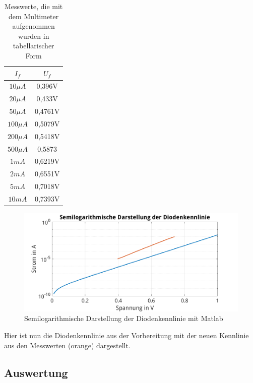 \documentclass{article}
\begin{document}
\begin{table}[h]
  \begin{center}
\begin{tabular}{|c|c|}
  \hline
  $I_{f}$ & $U_{f}$  \\
  \hline
  $10\mu A$ & 0,396V\\
  \hline
  $20\mu A$ & 0,433V\\
  \hline
  $50\mu A$ & 0,4761V\\
  \hline
  $100\mu A$ & 0,5079V\\
  \hline
  $200\mu A$ & 0,5418V\\
  \hline
  $500\mu A$ & 0,5873\\
  \hline
  $1mA$ &
          0,6219V\\
  \hline
  $2mA$ & 0,6551V\\
  \hline
  $5mA$ & 0,7018V\\
  \hline
  $10mA$ & 0,7393V\\
  \hline
\end{tabular}
\caption{Messwerte, die mit dem Multimeter aufgenommen wurden in tabellarischer Form}
\end{center}
\end{table}

\begin{figure}[h]
  \begin{center}
    \includegraphics[scale=0.6]{../assets/images/EL1P2/SemilogDiodeVergleich.png}
    \caption{Semilogarithmische Darstellung der Diodenkennlinie mit Matlab}
  \end{center}
\end{figure}

Hier ist nun die Diodenkennlinie aus der Vorbereitung mit der neuen Kennlinie aus den Messwerten (orange) dargestellt.
\newpage
\subsection{Auswertung}
\end{document}
